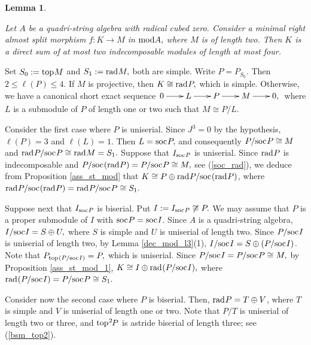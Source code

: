 \documentclass[10pt]{amsart}
\newtheorem{Lemma}[Theo]{Lemma}
\theoremstyle{definition}
\newcommand{\mmod}{{\rm mod}}
\newcommand{\rad}{{\rm rad}\hspace{.5pt}}
\newcommand{\soc}{{\rm soc}\hspace{.5pt}}
\newcommand{\ntop}{{\rm top}\hspace{.5pt}}
\begin{document}

\vspace{2pt}

\begin{Lemma}\label{4sa_rasm_l2}

Let $A$ be a quadri-string algebra with radical cubed zero. Consider a minimal right almost split morphism $f: K\to M$ in $\mmod A,$ where $M$ is of length two. Then $K$ is a direct sum of at most two indecomposable modules of length at most four.

\end{Lemma}

\vspace{-1.5pt}

 Set $S_0:=\ntop M$ and $S_1:=\rad M,$ both are simple. 
Write $P=P_{S_0}.$ Then $2\le \ell(P)\le 4$. If $M$ is projective, then $K\cong \rad P,$ which is simple. \vspace{-1pt} Otherwise, we have a canonical short exact sequence
$\xymatrixcolsep{20pt}\xymatrix{\hspace{-2pt} 0\ar[r] & L \ar[r] & P\ar[r] & M\ar[r] & 0,}$ \vspace{-1pt} where $L$ is a submodule of $P$ of length one or two such that $M\cong P/L.$

Consider the first case where $P$ is uniserial. Since $J^3=0$ by the hypothesis, $\ell(P)=3$ and $\ell(L)=1$. Then $L=\soc P,$ and consequently $P/\soc P \cong M$ and $\rad P/\soc P\cong \rad M=S_1.$ 
Suppose that $I_{\soc P}$ is uniserial. Since $\rad P$ is indecomposable and $P/\soc(\rad P)=P/\soc P\cong M,$ see (\ref{soc_rad}), we deduce from Proposition \ref{ass_st_mod} that $K\cong P\oplus \rad P/\soc(\rad P)$, where $\rad P/\soc(\rad P) = \rad P/\soc P \cong S_1.$ 

Suppose next that $I_{\soc P}$ is biserial. Put $I:=I_{\soc P} \not\cong P.$ We may assume that $P$ is a proper submodule of $I$ with $\soc P=\soc I$. Since $A$ is a quadri-string algebra, $I/\soc I=S\oplus U,$ where $S$ is simple and $U$ is uniserial of length two. Since $P/\soc I$ is uniserial of length two, by Lemma \ref{dec_mod_l3}(1), $I/\soc I=S\oplus (P/\soc I)$. Note that $P_{\ntop(P/\soc I)}=P,$ which is uniserial. Since $P/\soc I=P/\soc P\cong M,$ by
Proposition \ref{ass_st_mod_1}, $K\cong I\oplus \rad(P/\soc I),$ where $ \rad(P/\soc I)=P/\soc P\cong S_1.$

Consider now the second case where $P$ is biserial. Then, $\rad P=T\oplus V$, where $T$ is simple and $V$ is uniserial of length one or two. 
Note that $P/T$ is uniserial of length two or three, and $\ntop^2\hspace{-1pt}P$ is astride biserial of length three; see (\ref{bsm_top2}).
\end{document}
